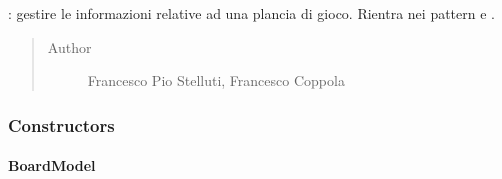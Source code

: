 \documentclass[letterpaper,10pt,italian,openany,oneside]{sphinxmanual}
\begin{document}
\begin{fulllineitems}
\label{\detokenize{test/it/unicam/cs/pa/mastermind/gamecore/BoardModel:it.unicam.cs.pa.mastermind.gamecore.BoardModel}}
: gestire le informazioni relative ad una plancia di gioco. Rientra nei pattern  e .
\begin{quote}\begin{description}
\item[{Author}] \leavevmode
Francesco Pio Stelluti, Francesco Coppola

\end{description}\end{quote}

\end{fulllineitems}



\subsubsection{Constructors}
\label{\detokenize{test/it/unicam/cs/pa/mastermind/gamecore/BoardModel:constructors}}

\paragraph{BoardModel}
\label{\detokenize{test/it/unicam/cs/pa/mastermind/gamecore/BoardModel:id1}}
\end{document}
